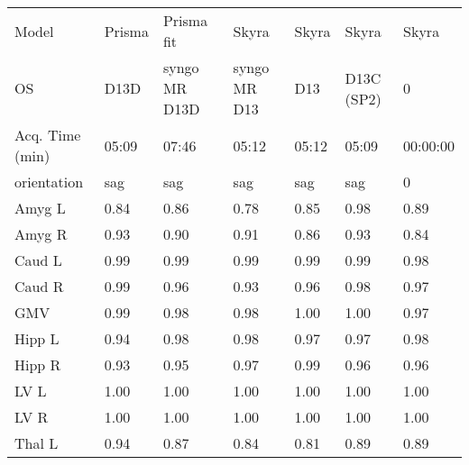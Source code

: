 \begin{table}
\begin{tabular}{lllllll}
Model                 &               Prisma &           Prisma fit &              Skyra &               Skyra &               Skyra &               Skyra \\
OS                    &                 D13D &        syngo MR D13D &       syngo MR D13 &                 D13 &          D13C (SP2) &                   0 \\
Acq. Time (min)       &             05:09 &             07:46 &           05:12 &            05:12 &            05:09 &            00:00:00 \\
orientation           &                  sag &                  sag &                sag &                 sag &                 sag &                   0 \\
\midrule
Amyg L                &                 0.84 &                 0.86 &               0.78 &                0.85 &                0.98 &                0.89 \\
Amyg R                &                 0.93 &                 0.90 &               0.91 &                0.86 &                0.93 &                0.84 \\
Caud L                &                 0.99 &                 0.99 &               0.99 &                0.99 &                0.99 &                0.98 \\
Caud R                &                 0.99 &                 0.96 &               0.93 &                0.96 &                0.98 &                0.97 \\
GMV                   &                 0.99 &                 0.98 &               0.98 &                1.00 &                1.00 &                0.97 \\
Hipp L                &                 0.94 &                 0.98 &               0.98 &                0.97 &                0.97 &                0.98 \\
Hipp R                &                 0.93 &                 0.95 &               0.97 &                0.99 &                0.96 &                0.96 \\
LV L                  &                 1.00 &                 1.00 &               1.00 &                1.00 &                1.00 &                1.00 \\
LV R                  &                 1.00 &                 1.00 &               1.00 &                1.00 &                1.00 &                1.00 \\
Thal L                &                 0.94 &                 0.87 &               0.84 &                0.81 &                0.89 &                0.89 \\

\end{tabular}
\end{table}
